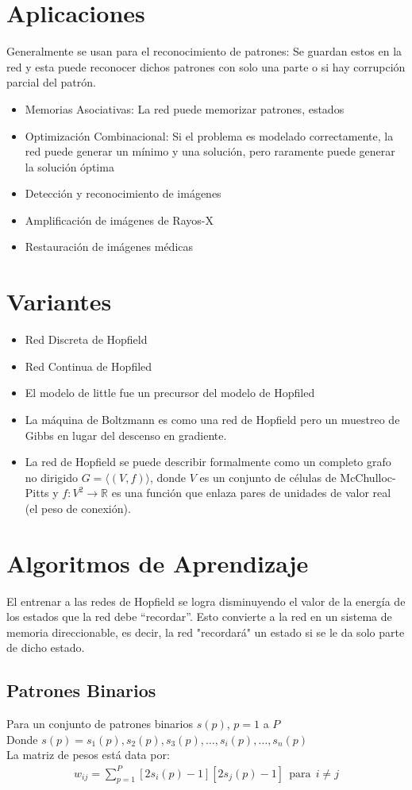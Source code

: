 \documentclass{article}
\begin{document}
\section{Aplicaciones}
Generalmente se usan para el reconocimiento de patrones: Se guardan estos en la red y esta puede reconocer dichos patrones con solo una parte o si hay corrupción parcial del patrón.
\begin{itemize}
	\item Memorias Asociativas: La red puede memorizar patrones, estados
	\item Optimización Combinacional: Si el problema es modelado correctamente, la red puede generar un mínimo y una solución, pero raramente puede generar la solución óptima
	\item Detección y reconocimiento de imágenes
	\item Amplificación de imágenes de Rayos-X
	\item Restauración de imágenes médicas
\end{itemize}
\section{Variantes}
\begin{itemize}
	\item Red Discreta de Hopfield
	\item Red Continua de Hopfiled
	\item El modelo de little fue un precursor del modelo de Hopfiled
	\item La máquina de Boltzmann es como una red de Hopfield pero un muestreo de Gibbs en lugar del descenso en gradiente.
	\item La red de Hopfield se puede describir formalmente como un completo grafo no dirigido $G = \langle (V, f) \rangle$, donde $V$ es un conjunto de células de McChulloc-Pitts y $f : V^2 \rightarrow \mathbb{R}$  es una función que enlaza pares de unidades de valor real (el peso de conexión).
\end{itemize}
\section{Algoritmos de Aprendizaje}
El entrenar a las redes de Hopfield se logra disminuyendo el valor de la energía de los estados que la red debe ``recordar''. Esto convierte a la red en un sistema de memoria direccionable, es decir, la red "recordará" un estado si se le da solo parte de dicho estado.
\subsection{Patrones Binarios}
Para un conjunto de patrones binarios $s(p)$, $p=1$ a $P$\\
Donde $s(p) = s_1(p), s_2(p), s_3(p), \dots, s_i(p),\dots, s_n(p)$\\
La matriz de pesos está data por: 
\begin{align}
	w_{ij} = \sum_{p=1}^{P}[2s_i(p) - 1][2s_j(p) - 1]\ \  \text{para}\ \  i \ne j
\end{align}
\end{document}
